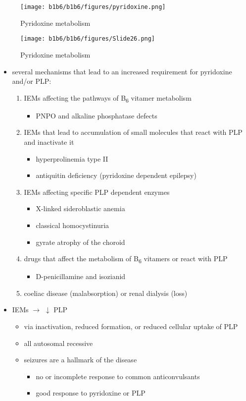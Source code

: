 \documentclass{scrartcl}
\begin{document}
\begin{figure}[htbp]
\centering
\texttt{[image: b1b6/b1b6/figures/pyridoxine.png]}
\caption{\label{fig:org7dccb7c}Pyridoxine metabolism}
\end{figure}

\begin{figure}[htbp]
\centering
\texttt{[image: b1b6/b1b6/figures/Slide26.png]}
\caption{\label{fig:org960b641}Pyridoxine metabolism}
\end{figure}

\begin{itemize}
\item several mechanisms that lead to an increased requirement for
pyridoxine and/or PLP:
\begin{enumerate}
\item IEMs affecting the pathways of B\textsubscript{6} vitamer metabolism
\begin{itemize}
\item PNPO and alkaline phosphatase defects
\end{itemize}
\item IEMs that lead to accumulation of small molecules that
react with PLP and inactivate it
\begin{itemize}
\item hyperprolinemia type II
\item antiquitin deficiency (pyridoxine dependent epilepsy)
\end{itemize}
\item IEMs affecting specific PLP dependent enzymes
\begin{itemize}
\item X-linked sideroblastic anemia
\item classical homocystinuria
\item gyrate atrophy of the choroid
\end{itemize}
\item drugs that affect the metabolism of B\textsubscript{6} vitamers or react with PLP
\begin{itemize}
\item D-penicillamine and isozianid
\end{itemize}
\item coeliac disease (malabsorption) or renal dialysis (loss)
\end{enumerate}
\item IEMs \(\to\) \(\downarrow\) PLP
\begin{itemize}
\item via inactivation, reduced formation, or reduced cellular uptake of
PLP
\item all autosomal recessive
\item seizures are a hallmark of the disease
\begin{itemize}
\item no or incomplete response to common anticonvulsants
\item good response to pyridoxine or PLP
\end{itemize}
\end{itemize}
\end{itemize}
\end{document}
